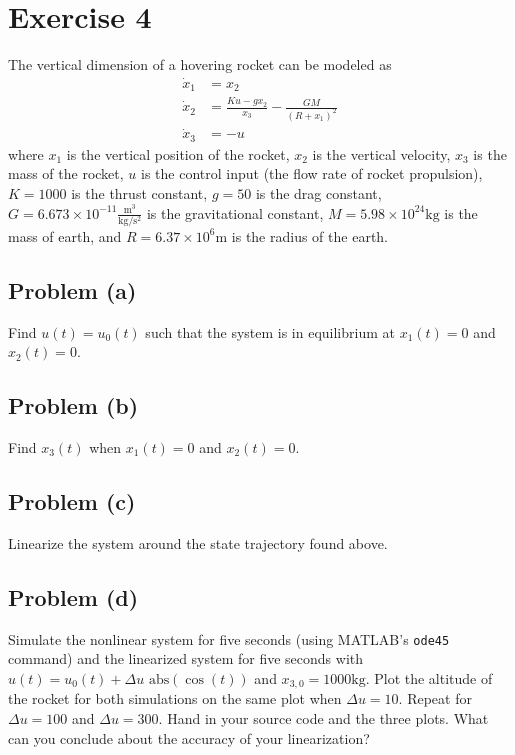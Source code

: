 \documentclass[11pt]{article}
\begin{document}
\section*{Exercise 4}
The vertical dimension of a hovering rocket can be modeled as
\begin{align*}
	\dot{x}_1 &= x_2 \\
	\dot{x}_2 &= \frac{Ku-gx_2}{x_3} - \frac{GM}{(R+x_1)^2} \\
	\dot{x}_3 &= -u
\end{align*}
where $x_1$ is the vertical position of the rocket, $x_2$ is the vertical velocity, $x_3$ is the mass of the rocket, $u$ is the control input (the flow rate of rocket propulsion), $K=1000$ is the thrust constant, $g=50$ is the drag constant, $G=6.673\times10^{-11}\frac{\text{m}^3}{\text{kg}/\text{s}^2}$ is the gravitational constant, $M=5.98\times10^{24}\text{kg}$ is the mass of earth, and $R=6.37\times10^6\text{m}$ is the radius of the earth.

\subsection*{Problem (a)}
Find $u(t)=u_0(t)$ such that the system is in equilibrium at $x_1(t)=0$ and $x_2(t)=0$.

\subparagraph*{}

\subsection*{Problem (b)}
Find $x_3(t)$ when $x_1(t)=0$ and $x_2(t)=0$.

\subparagraph*{}

\subsection*{Problem (c)}
Linearize the system around the state trajectory found above.

\subparagraph*{}

\subsection*{Problem (d)}
Simulate the nonlinear system for five seconds (using MATLAB's \texttt{ode45} command) and the linearized system for five seconds with $u(t)=u_0(t)+\Delta u\text{ abs}(\cos(t))$ and $x_{3,0}=1000\text{kg}$. Plot the altitude of the rocket for both simulations on the same plot when $\Delta u=10$. Repeat for $\Delta u=100$ and $\Delta u=300$. Hand in your source code and the three plots. What can you conclude about the accuracy of your linearization?
\end{document}
